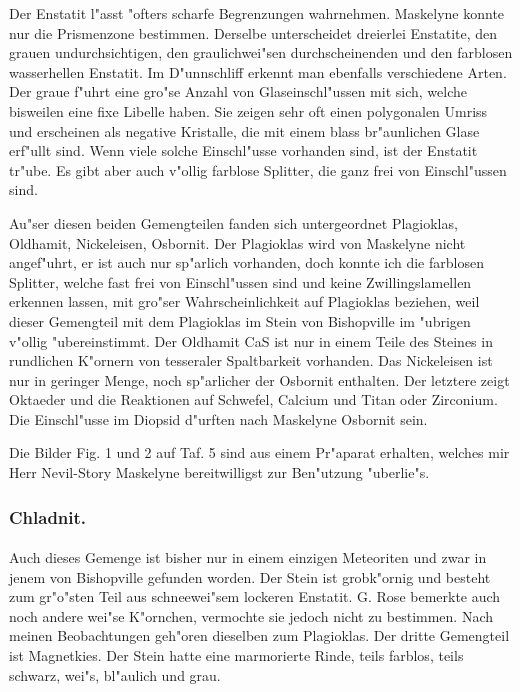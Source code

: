\documentclass[a4paper, 11pt, oneside, polutonikogreek, german]{article}
\begin{document}
Der Enstatit l"asst "ofters scharfe Begrenzungen wahrnehmen. Maskelyne konnte nur die Prismenzone bestimmen. Derselbe unterscheidet dreierlei Enstatite, den grauen undurchsichtigen, den graulichwei"sen durchscheinenden und den farblosen wasserhellen Enstatit. Im D"unnschliff erkennt man ebenfalls verschiedene Arten. Der graue f"uhrt eine gro"se Anzahl von Glaseinschl"ussen mit sich, welche bisweilen eine fixe Libelle haben. Sie zeigen sehr oft einen polygonalen Umriss und erscheinen als negative Kristalle, die mit einem blass br"aunlichen Glase erf"ullt sind. Wenn viele solche Einschl"usse vorhanden sind, ist der Enstatit tr"ube. Es gibt aber auch v"ollig farblose Splitter, die ganz frei von Einschl"ussen sind.

Au"ser diesen beiden Gemengteilen fanden sich untergeordnet Plagioklas, Oldhamit, Nickeleisen, Osbornit. Der Plagioklas wird von Maskelyne nicht angef"uhrt, er ist auch nur sp"arlich vorhanden, doch konnte ich die farblosen Splitter, welche fast frei von Einschl"ussen sind und keine Zwillingslamellen erkennen lassen, mit gro"ser Wahrscheinlichkeit auf Plagioklas beziehen, weil dieser Gemengteil mit dem Plagioklas im Stein von Bishopville im "ubrigen v"ollig "ubereinstimmt. Der Oldhamit CaS ist nur in einem Teile des Steines in rundlichen K"ornern von tesseraler Spaltbarkeit vorhanden. Das Nickeleisen ist nur in geringer Menge, noch sp"arlicher der Osbornit enthalten. Der letztere zeigt Oktaeder und die Reaktionen auf Schwefel, Calcium und Titan oder Zirconium. Die Einschl"usse im Diopsid d"urften nach Maskelyne Osbornit sein.

Die Bilder Fig. 1 und 2 auf Taf. 5 sind aus einem Pr"aparat erhalten, welches mir Herr Nevil-Story Maskelyne bereitwilligst zur Ben"utzung "uberlie"s.

\subsubsection{Chladnit.}
\paragraph{}
Auch dieses Gemenge ist bisher nur in einem einzigen Meteoriten und zwar in jenem von Bishopville gefunden worden. Der Stein ist grobk"ornig und besteht zum gr"o"sten Teil aus schneewei"sem lockeren Enstatit. G. Rose bemerkte auch noch andere wei"se K"ornchen, vermochte sie jedoch nicht zu bestimmen. Nach meinen Beobachtungen geh"oren dieselben zum Plagioklas. Der dritte Gemengteil ist Magnetkies. Der Stein hatte eine marmorierte Rinde, teils farblos, teils schwarz, wei"s, bl"aulich und grau.
\end{document}
